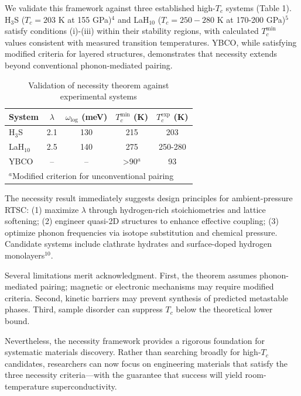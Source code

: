 \documentclass[letter,naturemag]{nature}
\begin{document}
\begin{figure}
\centering
{}
\end{figure}

We validate this framework against three established high-$T_c$ systems (Table 1). H$_3$S ($T_c = 203$ K at 155 GPa)$^{4}$ and LaH$_{10}$ ($T_c = 250-280$ K at 170-200 GPa)$^{5}$ satisfy conditions (i)-(iii) within their stability regions, with calculated $T_c^{\text{min}}$ values consistent with measured transition temperatures. YBCO, while satisfying modified criteria for layered structures, demonstrates that necessity extends beyond conventional phonon-mediated pairing.

\begin{table}
\centering
\caption{Validation of necessity theorem against experimental systems}
\begin{tabular}{lcccc}
\toprule
System & $\lambda$ & $\omega_{\text{log}}$ (meV) & $T_c^{\text{min}}$ (K) & $T_c^{\text{exp}}$ (K) \\
\midrule
H$_3$S & 2.1 & 130 & 215 & 203 \\
LaH$_{10}$ & 2.5 & 140 & 275 & 250-280 \\
YBCO & -- & -- & >90$^a$ & 93 \\
\bottomrule
\multicolumn{5}{l}{$^a$Modified criterion for unconventional pairing}
\end{tabular}
\end{table}

The necessity result immediately suggests design principles for ambient-pressure RTSC: (1) maximize $\lambda$ through hydrogen-rich stoichiometries and lattice softening; (2) engineer quasi-2D structures to enhance effective coupling; (3) optimize phonon frequencies via isotope substitution and chemical pressure. Candidate systems include clathrate hydrates and surface-doped hydrogen monolayers$^{10}$.

Several limitations merit acknowledgment. First, the theorem assumes phonon-mediated pairing; magnetic or electronic mechanisms may require modified criteria. Second, kinetic barriers may prevent synthesis of predicted metastable phases. Third, sample disorder can suppress $T_c$ below the theoretical lower bound.

Nevertheless, the necessity framework provides a rigorous foundation for systematic materials discovery. Rather than searching broadly for high-$T_c$ candidates, researchers can now focus on engineering materials that satisfy the three necessity criteria---with the guarantee that success will yield room-temperature superconductivity.
\end{document}
